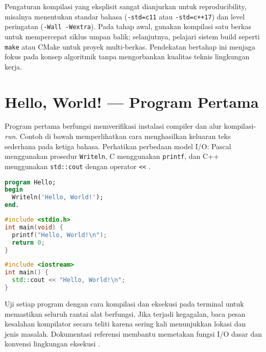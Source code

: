 \documentclass[../main.tex]{subfiles}
\begin{document}
Pengaturan kompilasi yang eksplisit sangat dianjurkan untuk reproducibility, misalnya menentukan standar bahasa (\texttt{-std=c11} atau \texttt{-std=c++17}) dan level peringatan (\texttt{-Wall -Wextra}). Pada tahap awal, gunakan kompilasi satu berkas untuk mempercepat siklus umpan balik; selanjutnya, pelajari sistem build seperti \texttt{make} atau CMake untuk proyek multi-berkas. Pendekatan bertahap ini menjaga fokus pada konsep algoritmik tanpa mengorbankan kualitas teknis lingkungan kerja.

\section{Hello, World! — Program Pertama}
Program pertama berfungsi memverifikasi instalasi compiler dan alur kompilasi-\emph{run}. Contoh di bawah memperlihatkan cara menghasilkan keluaran teks sederhana pada ketiga bahasa. Perhatikan perbedaan model I/O: Pascal menggunakan prosedur \texttt{Writeln}, C menggunakan \texttt{printf}, dan C++ menggunakan \texttt{std::cout} dengan operator \texttt{<<} \parencite{w3pascal-io,gnu-c-manual,cpp-reference}.

\begin{lstlisting}[language=Pascal, caption={Hello World pada Pascal}]
program Hello;
begin
  Writeln('Hello, World!');
end.
\end{lstlisting}

\begin{lstlisting}[language=C, caption={Hello World pada C}]
#include <stdio.h>
int main(void) {
  printf("Hello, World!\n");
  return 0;
}
\end{lstlisting}

\begin{lstlisting}[language=C++, caption={Hello World pada C++}]
#include <iostream>
int main() {
  std::cout << "Hello, World!\n";
}
\end{lstlisting}

Uji setiap program dengan cara kompilasi dan eksekusi pada terminal untuk memastikan seluruh rantai alat berfungsi. Jika terjadi kegagalan, baca pesan kesalahan kompilator secara teliti karena sering kali menunjukkan lokasi dan jenis masalah. Dokumentasi referensi membantu memetakan fungsi I/O dasar dan konvensi lingkungan eksekusi \parencite{w3pascal-io,gnu-c-manual,cpp-reference}.
\end{document}
